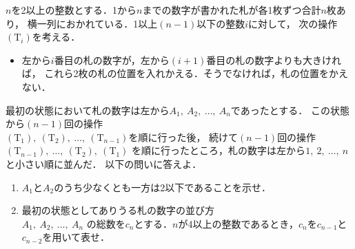 ﻿\documentclass[../../../uem_tok_q.tex]{subfiles}
\begin{document}
    $n$を2以上の整数とする．1から$n$までの数字が書かれた札が各1枚ずつ合計$n$枚あり，%
    横一列におかれている．1以上$(n-1)$以下の整数$i$に対して，%
    次の操作$(\mathrm{T}_i)$を考える．
    \begin{itemize}[label={$(\mathrm{T}_i)$}, leftmargin=4\zw, labelsep=.7\zw, topsep=4pt]
        \item 左から$i$番目の札の数字が，左から$(i+1)$番目の札の数字よりも大きければ，%
            これら2枚の札の位置を入れかえる．そうでなければ，札の位置をかえない．
    \end{itemize}

    最初の状態において札の数字は左から$A_1,\:A_2,\:\dots,\:A_n$であったとする．%
    この状態から$(n-1)$回の操作\\
    $(\mathrm{T}_1),\:(\mathrm{T}_2),\:\dots,\:(\mathrm{T}_{n-1})$を順に行った後，%
    続けて$(n-1)$回の操作$(\mathrm{T}_{n-1}),\:\dots,\:(\mathrm{T}_2),\:(\mathrm{T}_1)$%
    を順に行ったところ，札の数字は左から$1,\:2,\:\dots,\:n$と小さい順に並んだ．%
    以下の問いに答えよ．

    \begin{enumerate}
        \item $A_1$と$A_2$のうち少なくとも一方は2以下であることを示せ．
        \item 最初の状態としてありうる札の数字の並び方\\
            $A_1,\:A_2,\:\dots,\:A_n$%
            の総数を$c_n$とする．$n$が4以上の整数であるとき，$c_n$を$c_{n-1}$と$c_{n-2}$を用いて表せ．
    \end{enumerate}
\end{document}
